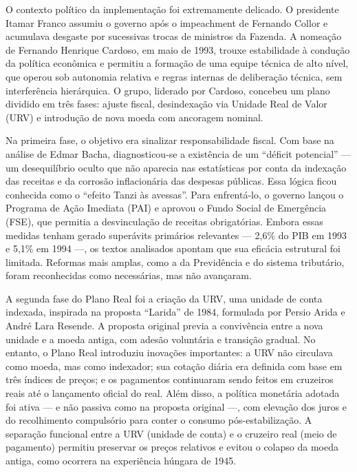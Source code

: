 \documentclass[a4paper,12pt]{article}[abntex2]
\begin{document}
O contexto político da implementação foi extremamente delicado. O presidente Itamar Franco assumiu o governo após o impeachment de Fernando Collor e acumulava desgaste por sucessivas trocas de ministros da Fazenda. A nomeação de Fernando Henrique Cardoso, em maio de 1993, trouxe estabilidade à condução da política econômica e permitiu a formação de uma equipe técnica de alto nível, que operou sob autonomia relativa e regras internas de deliberação técnica, sem interferência hierárquica. O grupo, liderado por Cardoso, concebeu um plano dividido em três fases: ajuste fiscal, desindexação via Unidade Real de Valor (URV) e introdução de nova moeda com ancoragem nominal.

Na primeira fase, o objetivo era sinalizar responsabilidade fiscal. Com base na análise de Edmar Bacha, diagnosticou-se a existência de um “déficit potencial” — um desequilíbrio oculto que não aparecia nas estatísticas por conta da indexação das receitas e da corrosão inflacionária das despesas públicas. Essa lógica ficou conhecida como o “efeito Tanzi às avessas”. Para enfrentá-lo, o governo lançou o Programa de Ação Imediata (PAI) e aprovou o Fundo Social de Emergência (FSE), que permitia a desvinculação de receitas obrigatórias. Embora essas medidas tenham gerado superávits primários relevantes — 2,6\% do PIB em 1993 e 5,1\% em 1994 —, os textos analisados apontam que sua eficácia estrutural foi limitada. Reformas mais amplas, como a da Previdência e do sistema tributário, foram reconhecidas como necessárias, mas não avançaram.

A segunda fase do Plano Real foi a criação da URV, uma unidade de conta indexada, inspirada na proposta “Larida” de 1984, formulada por Persio Arida e André Lara Resende. A proposta original previa a convivência entre a nova unidade e a moeda antiga, com adesão voluntária e transição gradual. No entanto, o Plano Real introduziu inovações importantes: a URV não circulava como moeda, mas como indexador; sua cotação diária era definida com base em três índices de preços; e os pagamentos continuaram sendo feitos em cruzeiros reais até o lançamento oficial do real. Além disso, a política monetária adotada foi ativa — e não passiva como na proposta original —, com elevação dos juros e do recolhimento compulsório para conter o consumo pós-estabilização. A separação funcional entre a URV (unidade de conta) e o cruzeiro real (meio de pagamento) permitiu preservar os preços relativos e evitou o colapso da moeda antiga, como ocorrera na experiência húngara de 1945.
\end{document}
